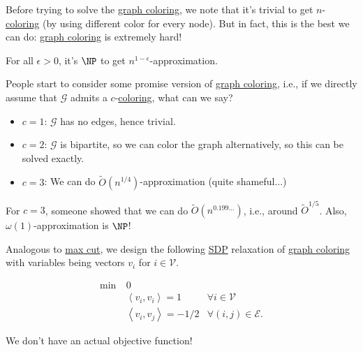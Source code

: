 Before trying to solve the \hyperref[prb:graph-coloring]{graph coloring}, we note that it's trivial to get \(n\)-\hyperref[def:coloring]{coloring} (by using different color for every node). But in fact, this is the best we can do: \hyperref[prb:graph-coloring]{graph coloring} is extremely hard!

\begin{theorem}
	For all \(\epsilon > 0\), it's \(\NP\) to get \(n^{1 - \epsilon }\)-approximation.
\end{theorem}

People start to consider some promise version of \hyperref[prb:graph-coloring]{graph coloring}, i.e., if we directly assume that \(\mathcal{G} \) admits a \(c\)-\hyperref[def:coloring]{coloring}, what can we say?
\begin{itemize}
	\item \(c = 1\): \(\mathcal{G} \) has no edges, hence trivial.
	\item \(c = 2\): \(\mathcal{G} \) is bipartite, so we can color the graph alternatively, so this can be solved exactly.
	\item \(c = 3\): We can do \(\widetilde{O} (n^{1 / 4})\)-approximation (quite shameful...)
\end{itemize}
\begin{remark}[SOTA for \(c=3\)]
	For \(c = 3\), someone showed that we can do \(\widetilde{O} (n^{0.199\dots  })\), i.e., around \(\widetilde{O} ^{1 / 5}\). Also, \(\omega (1)\)-approximation is \(\NP\)!
\end{remark}

Analogous to \hyperref[prb:max-cut]{max cut}, we design the following \hyperref[eq:graph-coloring]{SDP} relaxation of \hyperref[prb:graph-coloring]{graph coloring} with variables being vectors \(v_i\) for \(i\in \mathcal{V} \).

\begin{equation}\label{eq:graph-coloring}
	\begin{aligned}
		\min~ & 0                                                                             \\
		      & \left\langle v_i, v_i \right\rangle = 1      & \forall i\in \mathcal{V}       \\
		      & \left\langle v_i, v_j \right\rangle = -1 / 2 & \forall (i, j)\in \mathcal{E}.
	\end{aligned}
\end{equation}

\begin{note}
	We don't have an actual objective function!
\end{note}

